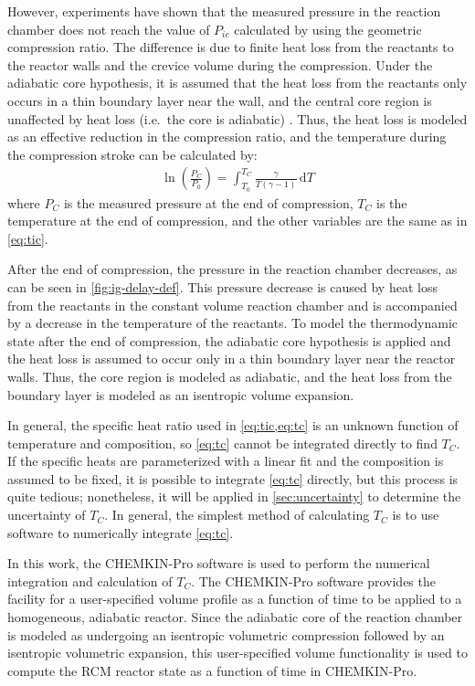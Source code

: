 \documentclass[../main.tex]{subfiles}
\begin{document}
However, experiments have shown that the measured pressure in the reaction chamber
does not reach the value of $P_{ic}$ calculated by using the geometric
compression ratio. The difference is due to finite heat loss from the
reactants to the reactor walls and the crevice volume during the
compression. Under the adiabatic core hypothesis, it is assumed that
the heat loss from the reactants only occurs in a thin boundary layer
near the wall, and the central core region is unaffected by heat loss
(i.e.\ the core is adiabatic) \cite{Desgroux1995}. Thus, the heat
loss is modeled as an effective reduction in the compression ratio, and
the temperature during the compression stroke can be calculated by:
%
\begin{align}
\ln\left(\frac{P_{C}}{P_0}\right) = \int_{T_0}^{T_{C}} \! \frac{\gamma}{T\left(\gamma-1\right)} \, \mathrm{d} T
\label{eq:tc}
\end{align}
%
where $P_C$ is the measured pressure at the end of compression, $T_C$
is the temperature at the end of compression, and the other variables
are the same as in \cref{eq:tic}.

After the end of compression, the pressure in the reaction chamber
decreases, as can be seen in \cref{fig:ig-delay-def}. This pressure
decrease is caused by heat loss from the reactants in the constant volume reaction
chamber and is accompanied by a decrease in the temperature of the
reactants. To model the thermodynamic state after the end of compression,
the adiabatic core hypothesis is applied and the heat loss is
assumed to occur only in a thin boundary layer near the reactor walls.
Thus, the core region is modeled as adiabatic, and the heat loss
from the boundary layer is modeled as an isentropic volume
expansion.

In general, the specific heat ratio used in \cref{eq:tic,eq:tc} is an
unknown function of temperature and composition, so \cref{eq:tc}
cannot be integrated directly to find $T_C$. If the specific heats are
parameterized with a linear fit and the composition is assumed to be
fixed, it is possible to integrate \cref{eq:tc} directly, but this
process is quite tedious; nonetheless, it will be applied in
\cref{sec:uncertainty} to determine the uncertainty of $T_C$. In
general, the simplest method of calculating $T_C$ is to use software
to numerically integrate \cref{eq:tc}.

In this work, the CHEMKIN-Pro \cite{Chemkin2012} software is used to
perform the numerical integration and calculation of $T_C$. The
CHEMKIN-Pro software provides the facility for a user-specified
volume profile as a function of time to be applied to a homogeneous,
adiabatic reactor. Since the adiabatic core of the reaction chamber
is modeled as undergoing an isentropic volumetric compression followed
by an isentropic volumetric expansion, this user-specified volume
functionality is used to compute the RCM reactor state as a function
of time in CHEMKIN-Pro.
\end{document}
